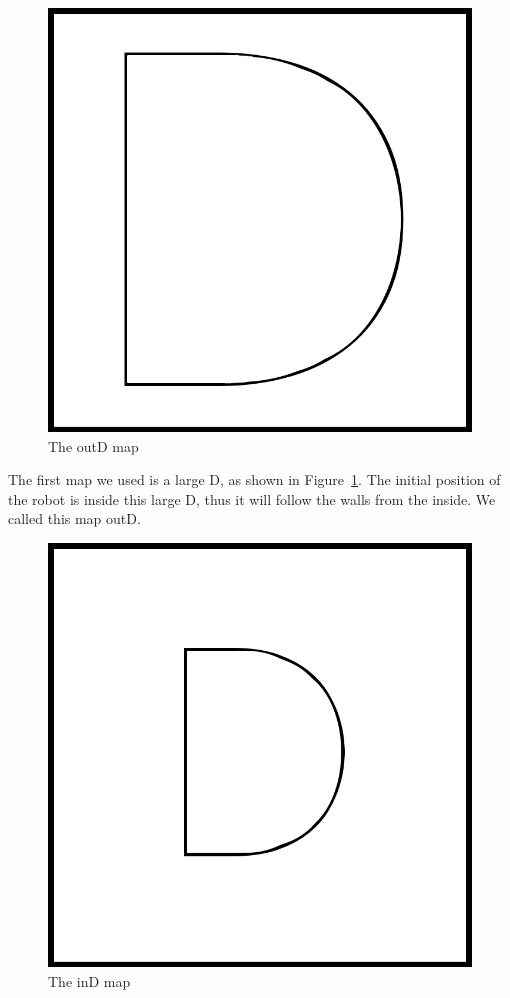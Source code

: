 \documentclass[10pt,journal,compsoc]{IEEEtran}
\begin{document}
\begin{figure}[thpb]
\centering
\includegraphics[scale=0.2]{img/outD.png}
\caption{The outD map}
\label{fig:outD_map}
\end{figure}

The first map we used is a large D, as shown in Figure~\ref{fig:outD_map}. The initial position of the robot is inside this large D, thus it will follow the walls from the inside. We called this map outD.

\begin{figure}[thpb]
\centering
\includegraphics[scale=0.2]{img/inD.png}
\caption{The inD map}
\label{fig:inD_map}
\end{figure}
\end{document}
